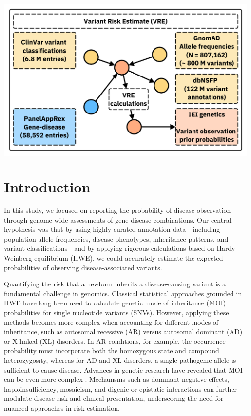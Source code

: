 \noindent\includegraphics[width=0.99\textwidth]{../images/var_risk_est.pdf}




\clearpage

\section{Introduction}

In this study, we focused on reporting the probability of disease observation through genome-wide assessments of gene-disease combinations. Our central hypothesis was that by using highly curated annotation data - including population allele frequencies, disease phenotypes, inheritance patterns, and variant classifications - and by applying rigorous calculations based on Hardy–Weinberg equilibrium (HWE), we could accurately estimate the expected probabilities of observing disease-associated variants.

Quantifying the risk that a newborn inherits a disease-causing variant is a fundamental challenge in genomics. Classical statistical approaches grounded in HWE \cite{MayoCentury2008, AbramovsHardyWeinberg2020} have long been used to calculate genetic mode of inheritance (MOI) probabilities for single nucleotide variants (SNVs). However, applying these methods becomes more complex when accounting for different modes of inheritance, such as autosomal recessive (AR) versus autosomal dominant (AD) or X-linked (XL) disorders. In AR conditions, for example, the occurrence probability must incorporate both the homozygous state and compound heterozygosity, whereas for AD and XL disorders, a single pathogenic allele is sufficient to cause disease. 
Advances in genetic research have revealed that MOI can be even more complex \cite{zschocke_mendelian_2023}. Mechanisms such as dominant negative effects, haploinsufficiency, mosaicism, and digenic or epistatic interactions can further modulate disease risk and clinical presentation, underscoring the need for nuanced approaches in risk estimation.

